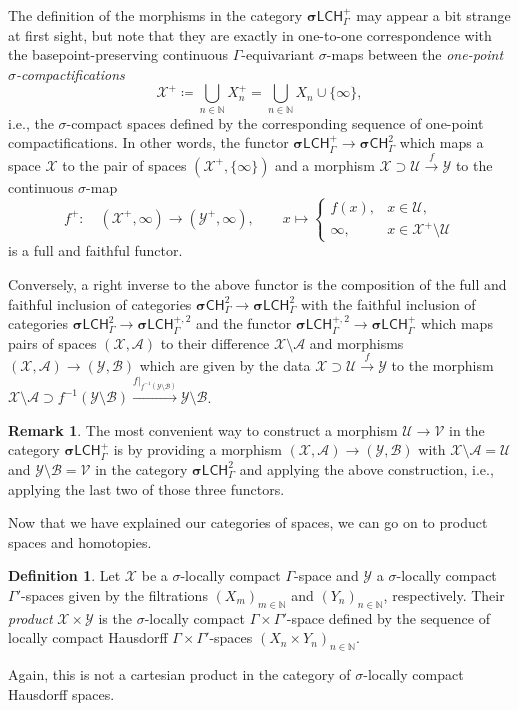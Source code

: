 \documentclass[pdftex]{sigma}
\numberwithin{equation}{section}
\theoremstyle{definition}
\newtheorem{defn}[thm]{Definition}
\newtheorem{rem}[thm]{Remark}
\newcommand{\N}{\mathbb{N}}
\newcommand{\cX}{\mathcal{X}}
\newcommand{\cY}{\mathcal{Y}}
\newcommand{\cA}{\mathcal{A}}
\newcommand{\cB}{\mathcal{B}}
\newcommand{\cU}{\mathcal{U}}
\newcommand{\cV}{\mathcal{V}}
\newcommand{\categoryfont}[1]{\mathsf{#1}}
\newcommand{\sLCHz}[1][\Gamma]{\boldsymbol\sigma\categoryfont{LCH}_{#1}^2}
\newcommand{\sLCHp}[1][\Gamma]{\boldsymbol\sigma\categoryfont{LCH}_{#1}^+}
\newcommand{\sLCHzp}[1][\Gamma]{\boldsymbol\sigma\categoryfont{LCH}_{#1}^{+,2}}
\newcommand{\sCHz}[1][\Gamma]{\boldsymbol\sigma\categoryfont{CH}_{#1}^2}
\begin{document}
The definition of the morphisms in the category $\sLCHp$ may appear a bit strange at first sight, but note that they are exactly in one-to-one correspondence with the basepoint-preserving continuous $\Gamma$-equivariant $\sigma$-maps between the \emph{one-point $\sigma$-compactifications}
\[
\cX^+\coloneqq\bigcup_{n\in\N}X_n^+=\bigcup_{n\in\N}X_n\cup\{\infty\},
\]
i.e., the $\sigma$-compact spaces defined by the corresponding sequence of one-point compactifications.
In other words, the functor $\sLCHp\to\sCHz$ which maps a space $\cX$ to the pair of spaces $(\cX^+,\{\infty\})$ and a morphism $\cX\supset\cU\xrightarrow{f}\cY$ to the continuous $\sigma$-map
\[
f^+\colon\quad(\cX^+,\infty)\to(\cY^+,\infty),\qquad
x\mapsto\begin{cases}f(x),&x\in \cU,\\\infty,&x\in\cX^+\setminus\cU\end{cases}
\]
is a full and faithful functor.

Conversely, a right inverse to the above functor is the composition of the full and faithful inclusion of categories
\(\sCHz\to\sLCHz\)
with the faithful inclusion of categories
\(\sLCHz\to\sLCHzp\)
and the functor
\(\sLCHzp\to\sLCHp\)
which maps pairs of spaces $(\cX,\cA)$ to their difference $\cX\setminus\cA$ and morphisms $(\cX,\cA)\to(\cY,\cB)$ which are given by the data $\cX\supset\cU\xrightarrow{f}\cY$ to the morphism $\cX\setminus\cA\supset f^{-1}(\cY\setminus\cB)\xrightarrow{f|_{f^{-1}(\cY\setminus\cB)}}\cY\setminus\cB$.

\begin{rem}\label{rem_morphconstr}
The most convenient way to construct a morphism $\cU\to\cV$ in the category $\sLCHp$ is by providing a morphism $(\cX,\cA)\to(\cY,\cB)$ with $\cX\setminus\cA=\cU$ and $\cY\setminus\cB=\cV$ in the category $\sLCHz$ and applying the above construction, i.e., applying the last two of those three functors.
\end{rem}


Now that we have explained our categories of spaces, we can go on to product spaces and homotopies.

\begin{defn}
Let $\cX$ be a $\sigma$-locally compact $\Gamma$-space and $\cY$ a $\sigma$-locally compact $\Gamma'$-spaces given by the filtrations $(X_m)_{m\in\N}$ and $(Y_n)_{n\in\N}$, respectively. Their \emph{product} $\cX\times\cY$ is the $\sigma$-locally compact $\Gamma\times\Gamma'$-space defined by the sequence of locally compact Hausdorff $\Gamma\times\Gamma'$-spaces $(X_n\times Y_n)_{n\in\N}$.
\end{defn}
Again, this is not a cartesian product in the category of $\sigma$-locally compact Hausdorff spaces.
\end{document}
